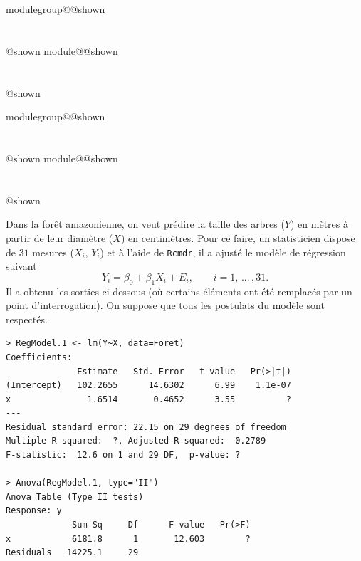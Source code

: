 \documentclass{Evaluation}
\makeatletter
\newcommand{\currentmodulekey}{}
\newcommand{\currentmoduletitle}{}
\newcommand{\currentgroupkey}{}
\newcommand{\currentgrouptitle}{}
\newcommand{\showmoduleifneeded}{%
  \ifx\currentgroupkey\empty\else
    \expandafter\ifx\csname modulegroup@\currentgroupkey @shown\endcsname\relax
      \section*{\currentgrouptitle}%
      \expandafter\gdef\csname modulegroup@\currentgroupkey @shown\endcsname{1}%
    \fi
  \fi
  \expandafter\ifx\csname module@\currentmodulekey @shown\endcsname\relax
    \section*{\currentmoduletitle}%
    \expandafter\gdef\csname module@\currentmodulekey @shown\endcsname{1}%
  \fi
}
\newenvironment{H23}{\showmoduleifneeded}{}
\newenvironment{A23}{\showmoduleifneeded}{}
\makeatother
\begin{document}
\begin{questions}
\begin{H23}
\begin{parts}
\end{parts}
\end{H23}

\begin{A23}
\question {} %
Dans la forêt amazonienne, on veut prédire la taille des arbres ($Y$) en mètres à partir de leur diamètre ($X$) en centimètres. Pour ce faire, un statisticien dispose de $31$ mesures ($X_i,\,Y_i$) et à l'aide de \texttt{Rcmdr}, il a ajusté le modèle de régression suivant
$$Y_i=\beta_0+\beta_1X_i+E_i,\qquad i=1,\,...\,,31.$$
Il a obtenu les sorties ci-dessous (où certains éléments ont été remplacés par un point d'interrogation). On suppose que tous les postulats du modèle sont respectés.

\begin{verbatim}
> RegModel.1 <- lm(Y~X, data=Foret)
Coefficients:
              Estimate   Std. Error   t value   Pr(>|t|)
(Intercept)   102.2655      14.6302      6.99    1.1e-07
x               1.6514       0.4652      3.55          ?
---
Residual standard error: 22.15 on 29 degrees of freedom
Multiple R-squared:  ?,	Adjusted R-squared:  0.2789
F-statistic:  12.6 on 1 and 29 DF,  p-value: ?

> Anova(RegModel.1, type="II")
Anova Table (Type II tests)
Response: y
             Sum Sq     Df      F value   Pr(>F)
x            6181.8      1       12.603        ?
Residuals   14225.1     29
\end{verbatim}

\end{A23}
\end{questions}
\end{document}
